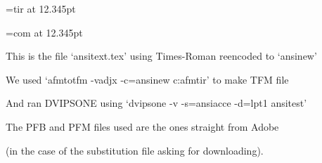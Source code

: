 







\nopagenumbers		%

\font\tir=tir at 12.345pt	%

\font\com=com at 12.345pt	%

\chardef{}		%

\chardef{}	%

\tir 

This is the file `{\com ansitext.tex}'
using Times-Roman reencoded to `{\com ansinew}'

\bigskip

We used  `{\com afmtotfm -vadjx -c=ansinew c:\bs afm\bs tir}'
to make TFM file

\bigskip	

And ran DVIPSONE using `{\com dvipsone -v -s=ansiacce -d=lpt1 ansitest}'

\bigskip	

The PFB and PFM files used are the ones straight from Adobe

(in the case of the substitution file asking for downloading).

\bigskip	

